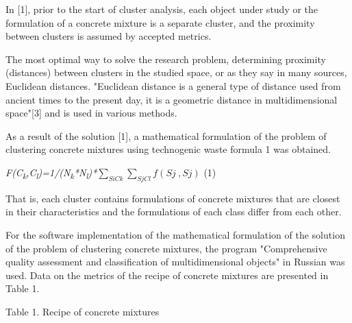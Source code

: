 In {[}1{]}, prior to the start of cluster analysis, each object under
study or the formulation of a concrete mixture is a separate cluster,
and the proximity between clusters is assumed by accepted metrics.

The most optimal way to solve the research problem, determining
proximity (distances) between clusters in the studied space, or as they
say in many sources, Euclidean distances. "Euclidean distance is a
general type of distance used from ancient times to the present day, it
is a geometric distance in multidimensional space"{[}3{]} and is used in
various methods.

As a result of the solution {[}1{]}, a mathematical formulation of the
problem of clustering concrete mixtures using technogenic waste formula
1 was obtained.

\emph{F(C\textsubscript{k},C\textsubscript{l})=1/(N\textsubscript{k}*N\textsubscript{l})*}\(\sum_{SiCk}^{}{\sum_{SjCl}^{}{f(Sj\ ,Sj)}}\)
(1)

That is, each cluster contains formulations of concrete mixtures that
are closest in their characteristics and the formulations of each class
differ from each other.

For the software implementation of the mathematical formulation of the
solution of the problem of clustering concrete mixtures, the program
"Comprehensive quality assessment and classification of multidimensional
objects" in Russian was used. Data on the metrics of the recipe of
concrete mixtures are presented in Table 1.

Table 1. Recipe of concrete mixtures

